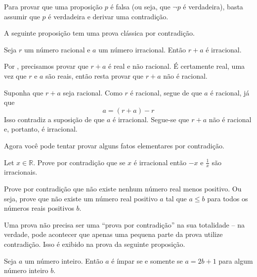 \begin{estratégia}
\begin{strategy}
\label{strProvingNegationsDirect}
\label{strProofByContradictionDirect}
Para provar que uma proposição $p$ é falsa (ou seja, que $\neg p$ é verdadeira), basta assumir que $p$ é verdadeira e derivar uma contradição.
\end{strategy}

A seguinte proposição tem uma prova clássica por contradição.

\begin{proposition}
Seja $r$ um número racional e $a$ um número irracional. Então $r+a$ é irracional.
\end{proposition}

\begin{cproof}
Por , precisamos provar que $r+a$ é real e não racional. É certamente real, uma vez que $r$ e $a$ são reais, então resta provar que $r+a$ não é racional.

Suponha que $r+a$ seja racional. Como $r$ é racional, segue de  que $a$ é racional, já que
\[
a = (r+a) - r
\]
Isso contradiz a suposição de que $a$ é irracional. Segue-se que $r+a$ não é racional e, portanto, é irracional.
\end{cproof}

Agora você pode tentar provar alguns fatos elementares por contradição.

\begin{exercise}
\label{exNegationAndReciprocalOfIrrationalNumbers}
Let $x \in \mathbb{R}$. Prove por contradição que se $x$ é irracional então $-x$ e $\frac{1}{x}$ são irracionais.
\end{exercise}

\begin{exercise}
\label{exNoLeastPositiveReal}
Prove por contradição que não existe nenhum número real menos positivo. Ou seja, prove que não existe um número real positivo $a$ tal que $a \le b$ para todos os números reais positivos $b$.
\end{exercise}

Uma prova não precisa ser uma “prova por contradição” na sua totalidade – na verdade, pode acontecer que apenas uma pequena parte da prova utilize contradição. Isso é exibido na prova da seguinte proposição.

\begin{proposition}
\label{propOddIffRemainderOfOne}
Seja $a$ um número inteiro. Então $a$ é ímpar se e somente se $a=2b+1$ para algum número inteiro $b$.
\end{proposition}
\begin{cproof}


\end{cproof}
\end{estratégia}
